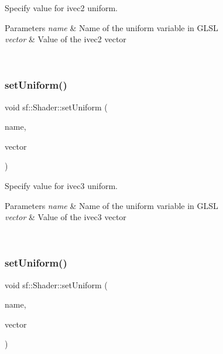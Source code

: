 Specify value for {\ttfamily ivec2} uniform. 


\begin{DoxyParams}{Parameters}
{\em name} & Name of the uniform variable in G\+L\+SL \\
\hline
{\em vector} & Value of the ivec2 vector \begin{DoxyVerb}\end{DoxyVerb}
 \\
\hline
\end{DoxyParams}
\mbox{\label{classsf_1_1_shader_a9e328e3e97cd753fdc7b842f4b0f202e}} 
\subsubsection{\texorpdfstring{setUniform()}{setUniform()}\hspace{0.1cm}{\footnotesize\ttfamily [7/16]}}
{\footnotesize\ttfamily void sf\+::\+Shader\+::set\+Uniform (\begin{DoxyParamCaption}\item[{const std\+::string \&}]{name,  }\item[{const \mbox{\hyperlink{namespacesf_1_1_glsl_a64f403dd0219e7f128ffddca641394df}{Glsl\+::\+Ivec3}} \&}]{vector }\end{DoxyParamCaption})}



Specify value for {\ttfamily ivec3} uniform. 


\begin{DoxyParams}{Parameters}
{\em name} & Name of the uniform variable in G\+L\+SL \\
\hline
{\em vector} & Value of the ivec3 vector \begin{DoxyVerb}\end{DoxyVerb}
 \\
\hline
\end{DoxyParams}
\mbox{\label{classsf_1_1_shader_a380e7a5a2896162c5fd08966c4523790}} 
\subsubsection{\texorpdfstring{setUniform()}{setUniform()}\hspace{0.1cm}{\footnotesize\ttfamily [8/16]}}
{\footnotesize\ttfamily void sf\+::\+Shader\+::set\+Uniform (\begin{DoxyParamCaption}\item[{const std\+::string \&}]{name,  }\item[{const \mbox{\hyperlink{structsf_1_1priv_1_1_vector4}{Glsl\+::\+Ivec4}} \&}]{vector }\end{DoxyParamCaption})}



